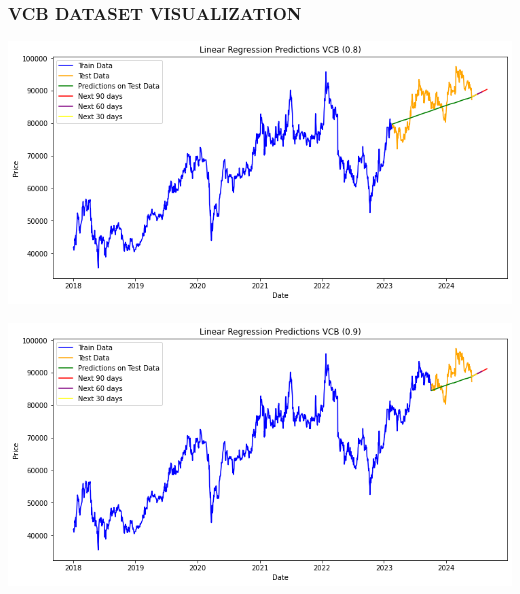 \documentclass[conference]{IEEEtran}
\begin{document}
\subsubsection{VCB DATASET VISUALIZATION}
\begin{minipage}{0.23\textwidth}
    \centering
    \includegraphics[width=\linewidth]{images/LR/LR_VCB_82.png}
    \label{fig:image1}
\end{minipage}
\hfill
\begin{minipage}{0.23\textwidth}
    \centering
    \includegraphics[width=\linewidth]{images/LR/LR_VCB_91.png}
    \label{fig:image2}
\end{minipage}
\end{document}
